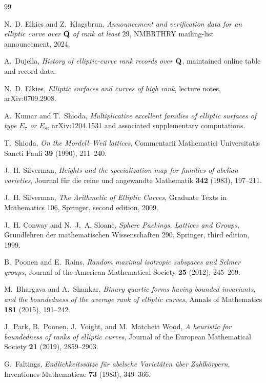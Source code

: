 \begin{thebibliography}{99}

N.~D. Elkies and Z.~Klagsbrun,
\emph{Announcement and verification data for an elliptic curve over $\mathbf Q$ of rank at least $29$},
NMBRTHRY mailing-list announcement, 2024.

A.~Dujella,
\emph{History of elliptic-curve rank records over $\mathbf Q$},
maintained online table and record data.

N.~D. Elkies,
\emph{Elliptic surfaces and curves of high rank},
lecture notes, arXiv:0709.2908.

A.~Kumar and T.~Shioda,
\emph{Multiplicative excellent families of elliptic surfaces of type $E_7$ or $E_8$},
arXiv:1204.1531 and associated supplementary computations.

T.~Shioda,
\emph{On the Mordell--Weil lattices},
Commentarii Mathematici Universitatis Sancti Pauli \textbf{39} (1990), 211--240.

J.~H. Silverman,
\emph{Heights and the specialization map for families of abelian varieties},
Journal f\"ur die reine und angewandte Mathematik \textbf{342} (1983), 197--211.

J.~H. Silverman,
\emph{The Arithmetic of Elliptic Curves},
Graduate Texts in Mathematics 106, Springer, second edition, 2009.

J.~H. Conway and N.~J.~A. Sloane,
\emph{Sphere Packings, Lattices and Groups},
Grundlehren der mathematischen Wissenschaften 290, Springer, third edition, 1999.

B.~Poonen and E.~Rains,
\emph{Random maximal isotropic subspaces and Selmer groups},
Journal of the American Mathematical Society \textbf{25} (2012), 245--269.

M.~Bhargava and A.~Shankar,
\emph{Binary quartic forms having bounded invariants, and the boundedness of the average rank of elliptic curves},
Annals of Mathematics \textbf{181} (2015), 191--242.

J.~Park, B.~Poonen, J.~Voight, and M.~Matchett Wood,
\emph{A heuristic for boundedness of ranks of elliptic curves},
Journal of the European Mathematical Society \textbf{21} (2019), 2859--2903.

G.~Faltings,
\emph{Endlichkeitss\"atze f\"ur abelsche Variet\"aten \"uber Zahlk\"orpern},
Inventiones Mathematicae \textbf{73} (1983), 349--366.

\end{thebibliography}
